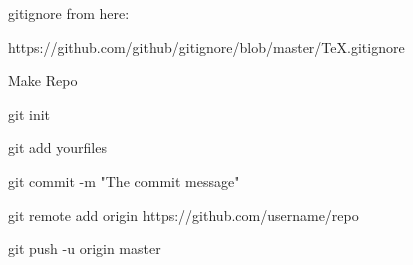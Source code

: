 \documentclass{article}
\begin{document}
gitignore from here:

https://github.com/github/gitignore/blob/master/TeX.gitignore

Make Repo

git init

git add yourfiles

git commit -m "The commit message"

git remote add origin https://github.com/username/repo

git push -u origin master
\end{document}

